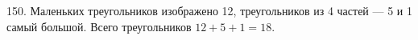 150. Маленьких треугольников изображено 12, треугольников из 4 частей --- 5 и 1 самый большой. Всего треугольников $12+5+1=18.$\\
